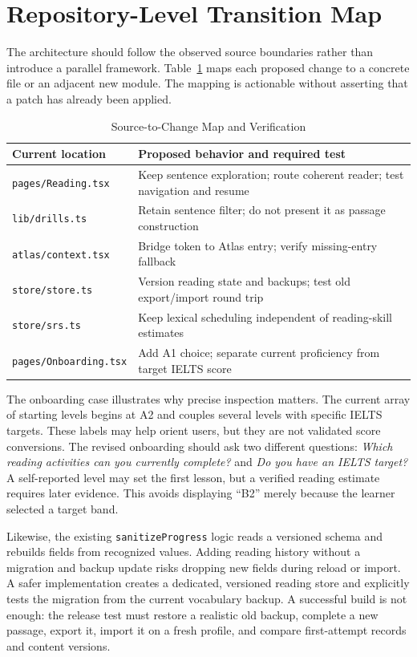 \documentclass[conference,10pt]{IEEEtran}
\begin{document}
\section{Repository-Level Transition Map}
The architecture should follow the observed source boundaries rather than introduce a parallel framework. Table~\ref{tab:files} maps each proposed change to a concrete file or an adjacent new module. The mapping is actionable without asserting that a patch has already been applied.

\begin{table}[t]
\caption{Source-to-Change Map and Verification}
\label{tab:files}
\centering\footnotesize
\begin{tabularx}{\columnwidth}{@{}p{}X@{}}
\toprule
Current location & Proposed behavior and required test\\
\midrule
\texttt{pages/Reading.tsx} & Keep sentence exploration; route coherent reader; test navigation and resume\\
\texttt{lib/drills.ts} & Retain sentence filter; do not present it as passage construction\\
\texttt{atlas/context.tsx} & Bridge token to Atlas entry; verify missing-entry fallback\\
\texttt{store/store.ts} & Version reading state and backups; test old export/import round trip\\
\texttt{store/srs.ts} & Keep lexical scheduling independent of reading-skill estimates\\
\texttt{pages/Onboarding.tsx} & Add A1 choice; separate current proficiency from target IELTS score\\
\bottomrule
\end{tabularx}
\end{table}

The onboarding case illustrates why precise inspection matters. The current array of starting levels begins at A2 and couples several levels with specific IELTS targets. These labels may help orient users, but they are not validated score conversions. The revised onboarding should ask two different questions: \emph{Which reading activities can you currently complete?} and \emph{Do you have an IELTS target?} A self-reported level may set the first lesson, but a verified reading estimate requires later evidence. This avoids displaying ``B2'' merely because the learner selected a target band.

Likewise, the existing \texttt{sanitizeProgress} logic reads a versioned schema and rebuilds fields from recognized values. Adding reading history without a migration and backup update risks dropping new fields during reload or import. A safer implementation creates a dedicated, versioned reading store and explicitly tests the migration from the current vocabulary backup. A successful build is not enough: the release test must restore a realistic old backup, complete a new passage, export it, import it on a fresh profile, and compare first-attempt records and content versions.
\end{document}
